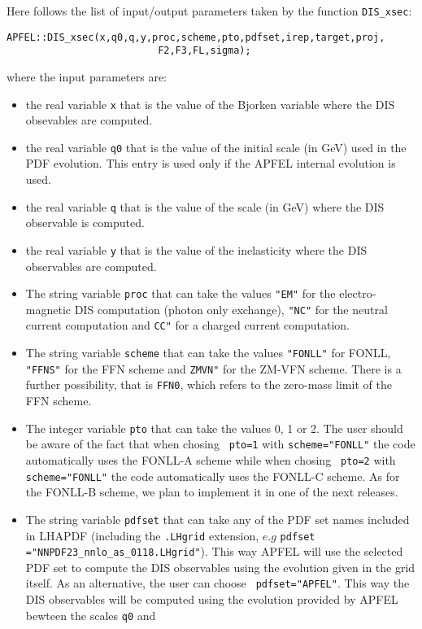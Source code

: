 \documentclass[10pt,a4paper]{article}
\begin{document}
Here follows the list of input/output parameters taken by the function {\tt DIS\_xsec}:
\begin{lstlisting}
APFEL::DIS_xsec(x,q0,q,y,proc,scheme,pto,pdfset,irep,target,proj,
                          F2,F3,FL,sigma);
\end{lstlisting}
where the input parameters are:
\begin{itemize}
\item the real variable {\tt x} that is the value of the Bjorken variable where the DIS
 obsevables are computed.
\item the real variable {\tt q0} that is the value of the initial scale (in GeV) used in the
 PDF evolution. This entry is used only if the APFEL internal
 evolution is used.
\item the real variable {\tt q} that is the value of the scale (in GeV) where the DIS
 observable is computed.
\item the real variable {\tt y} that is the value of the inelasticity where the DIS
observables are computed.
\item The string variable {\tt proc} that can take the values {\tt "EM"} for the
  electro-magnetic DIS computation (photon only exchange), {\tt "NC"}
  for the neutral current computation and {\tt CC"} for a charged
  current computation.
\item The string variable {\tt scheme} that can take the values {\tt "FONLL"} for FONLL, {\tt "FFNS"}
  for the FFN scheme and {\tt ZMVN"} for the ZM-VFN scheme. There is a
  further possibility, that is {\tt FFN0}, which refers to the
  zero-mass limit of the FFN scheme.
\item The integer variable {\tt pto} that can take the values 0, 1 or
  2. The user should be aware of the fact that when chosing {\tt
    pto=1} with {\tt scheme="FONLL"} the code automatically uses the
  FONLL-A scheme while when chosing {\tt
    pto=2} with {\tt scheme="FONLL"} the code automatically uses the
  FONLL-C scheme. As for the FONLL-B scheme, we
  plan to implement it in one of the next releases.
\item The string variable {\tt pdfset} that can take any of the PDF set
  names included in LHAPDF (including the {\tt .LHgrid} extension,
  $e.g$ {\tt pdfset ="NNPDF23\_nnlo\_as\_0118.LHgrid"}). This way APFEL will use
  the selected PDF set to compute the DIS observables using the evolution
  given in the grid itself. As an alternative, the user can choose {\tt
    pdfset="APFEL"}. This way the DIS observables will be computed
  using the evolution provided by APFEL bewteen the scales {\tt q0} and {\tt
}
\end{itemize}
\end{document}
